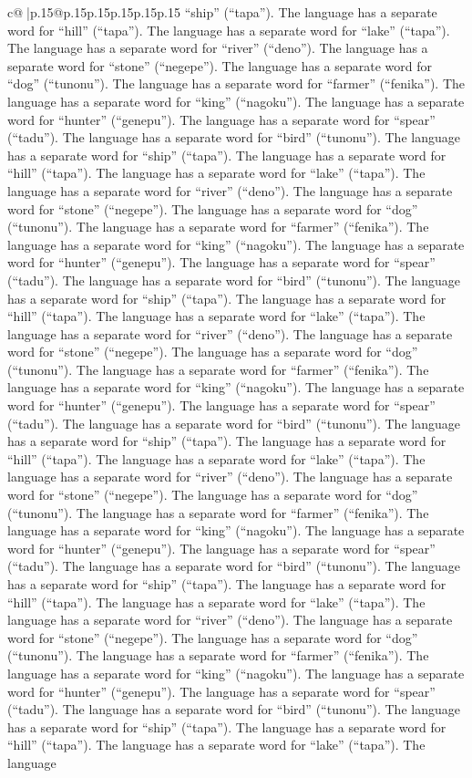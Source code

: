 \documentclass{article}
\begin{document}
{\begin{supertabular}{c@{$\;$}|p{.15\linewidth}@{}p{.15\linewidth}p{.15\linewidth}p{.15\linewidth}p{.15\linewidth}p{.15\linewidth}}
{{{“ship” (“tapa”). The language has a separate word for “hill” (“tapa”). The language has a separate word for “lake” (“tapa”). The language has a separate word for “river” (“deno”). The language has a separate word for “stone” (“negepe”). The language has a separate word for “dog” (“tunonu”). The language has a separate word for “farmer” (“fenika”). The language has a separate word for “king” (“nagoku”). The language has a separate word for “hunter” (“genepu”). The language has a separate word for “spear” (“tadu”). The language has a separate word for “bird” (“tunonu”). The language has a separate word for “ship” (“tapa”). The language has a separate word for “hill” (“tapa”). The language has a separate word for “lake” (“tapa”). The language has a separate word for “river” (“deno”). The language has a separate word for “stone” (“negepe”). The language has a separate word for “dog” (“tunonu”). The language has a separate word for “farmer” (“fenika”). The language has a separate word for “king” (“nagoku”). The language has a separate word for “hunter” (“genepu”). The language has a separate word for “spear” (“tadu”). The language has a separate word for “bird” (“tunonu”). The language has a separate word for “ship” (“tapa”). The language has a separate word for “hill” (“tapa”). The language has a separate word for “lake” (“tapa”). The language has a separate word for “river” (“deno”). The language has a separate word for “stone” (“negepe”). The language has a separate word for “dog” (“tunonu”). The language has a separate word for “farmer” (“fenika”). The language has a separate word for “king” (“nagoku”). The language has a separate word for “hunter” (“genepu”). The language has a separate word for “spear” (“tadu”). The language has a separate word for “bird” (“tunonu”). The language has a separate word for “ship” (“tapa”). The language has a separate word for “hill” (“tapa”). The language has a separate word for “lake” (“tapa”). The language has a separate word for “river” (“deno”). The language has a separate word for “stone” (“negepe”). The language has a separate word for “dog” (“tunonu”). The language has a separate word for “farmer” (“fenika”). The language has a separate word for “king” (“nagoku”). The language has a separate word for “hunter” (“genepu”). The language has a separate word for “spear” (“tadu”). The language has a separate word for “bird” (“tunonu”). The language has a separate word for “ship” (“tapa”). The language has a separate word for “hill” (“tapa”). The language has a separate word for “lake” (“tapa”). The language has a separate word for “river” (“deno”). The language has a separate word for “stone” (“negepe”). The language has a separate word for “dog” (“tunonu”). The language has a separate word for “farmer” (“fenika”). The language has a separate word for “king” (“nagoku”). The language has a separate word for “hunter” (“genepu”). The language has a separate word for “spear” (“tadu”). The language has a separate word for “bird” (“tunonu”). The language has a separate word for “ship” (“tapa”). The language has a separate word for “hill” (“tapa”). The language has a separate word for “lake” (“tapa”). The language }}}
\end{supertabular}}
\end{document}
